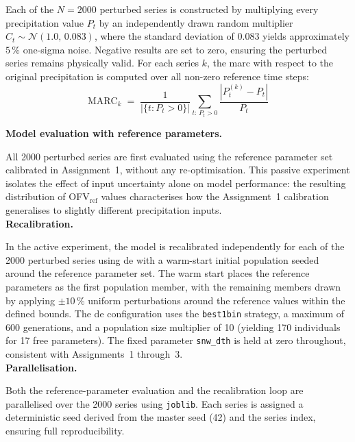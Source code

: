 Each of the $N = 2000$ perturbed series is constructed by multiplying every precipitation value $P_t$ by an independently drawn random multiplier $C_t \sim \mathcal{N}(1.0,\, 0.083)$, where the standard deviation of $0.083$ yields approximately $5\,\%$ one-sigma noise. Negative results are set to zero, ensuring the perturbed series remains physically valid. For each series $k$, the \ac{marc} with respect to the original precipitation is computed over all non-zero reference time steps:
\begin{equation}
    \text{MARC}_k \;=\; \frac{1}{\left|\{t : P_t > 0\}\right|} \sum_{t:\, P_t > 0} \frac{|P_t^{(k)} - P_t|}{P_t}
\end{equation}

\vspace{0.5cm}
\noindent\textbf{Model evaluation with reference parameters.}
\vspace{0.5cm}

All 2000 perturbed series are first evaluated using the reference parameter set calibrated in Assignment~1, without any re-optimisation. This passive experiment isolates the effect of input uncertainty alone on model performance: the resulting distribution of OFV$_\text{ref}$ values characterises how the Assignment~1 calibration generalises to slightly different precipitation inputs.\\

\noindent\textbf{Recalibration.}
\vspace{0.5cm}

In the active experiment, the model is recalibrated independently for each of the 2000 perturbed series using \ac{de} with a warm-start initial population seeded around the reference parameter set. The warm start places the reference parameters as the first population member, with the remaining members drawn by applying $\pm 10\,\%$ uniform perturbations around the reference values within the defined bounds. The \ac{de} configuration uses the \texttt{best1bin} strategy, a maximum of 600 generations, and a population size multiplier of 10 (yielding 170 individuals for 17 free parameters). The fixed parameter \texttt{snw\_dth} is held at zero throughout, consistent with Assignments~1 through~3.\\

\noindent\textbf{Parallelisation.}
\vspace{0.5cm}

Both the reference-parameter evaluation and the recalibration loop are parallelised over the 2000 series using \texttt{joblib}. Each series is assigned a deterministic seed derived from the master seed (42) and the series index, ensuring full reproducibility.

